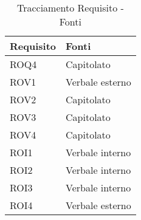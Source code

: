 \newpage
\begin{table}[h!]
    \centering
    \renewcommand{\arraystretch}{1.6} %
    \begin{tabularx}{0.8\textwidth}{|>{\centering\arraybackslash}p{2.8cm}|>{\centering\arraybackslash}X|} \hline
    \rowcolor[HTML]{FFD700} 
    \textbf{Requisito} & \textbf{Fonti} \\ \hline
    ROQ4 & Capitolato \\ \hline
    ROV1 & Verbale esterno\\ \hline
    ROV2 & Capitolato\\ \hline
    ROV3 & Capitolato\\ \hline
    ROV4 & Capitolato\\ \hline
    ROI1 & Verbale interno\\ \hline
    ROI2 & Verbale interno\\ \hline
    ROI3 & Verbale interno\\ \hline
    ROI4 & Verbale esterno\\ \hline
    \end{tabularx}
    \caption{Tracciamento Requisito - Fonti}
    \label{tab:Tracciamento_requisiti_fonti}
\end{table}